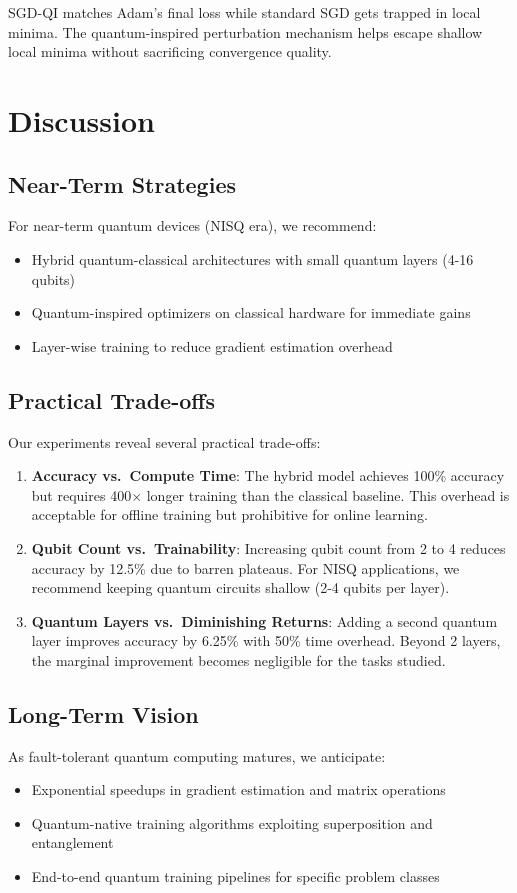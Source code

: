 \documentclass[11pt,a4paper]{article}
\begin{document}
SGD-QI matches Adam's final loss while standard SGD gets trapped in local minima. The quantum-inspired perturbation mechanism helps escape shallow local minima without sacrificing convergence quality.

\section{Discussion}

\subsection{Near-Term Strategies}
For near-term quantum devices (NISQ era), we recommend:
\begin{itemize}
    \item Hybrid quantum-classical architectures with small quantum layers (4-16 qubits)
    \item Quantum-inspired optimizers on classical hardware for immediate gains
    \item Layer-wise training to reduce gradient estimation overhead
\end{itemize}

\subsection{Practical Trade-offs}
Our experiments reveal several practical trade-offs:

\begin{enumerate}
    \item \textbf{Accuracy vs.\ Compute Time}: The hybrid model achieves 100\% accuracy but requires 400$\times$ longer training than the classical baseline. This overhead is acceptable for offline training but prohibitive for online learning.
    \item \textbf{Qubit Count vs.\ Trainability}: Increasing qubit count from 2 to 4 reduces accuracy by 12.5\% due to barren plateaus. For NISQ applications, we recommend keeping quantum circuits shallow (2-4 qubits per layer).
    \item \textbf{Quantum Layers vs.\ Diminishing Returns}: Adding a second quantum layer improves accuracy by 6.25\% with 50\% time overhead. Beyond 2 layers, the marginal improvement becomes negligible for the tasks studied.
\end{enumerate}

\subsection{Long-Term Vision}
As fault-tolerant quantum computing matures, we anticipate:
\begin{itemize}
    \item Exponential speedups in gradient estimation and matrix operations
    \item Quantum-native training algorithms exploiting superposition and entanglement
    \item End-to-end quantum training pipelines for specific problem classes
\end{itemize}
\end{document}
